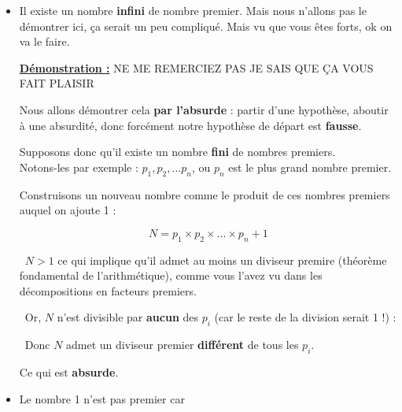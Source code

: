 \documentclass[12pt]{article}
\begin{document}
\begin{itemize}
    \item Il existe un nombre \textbf{infini} de nombre premier.
    Mais nous n'allons pas le démontrer ici, ça serait un peu compliqué. Mais vu que vous êtes forts, ok on va le 
    faire.

    \begin{mdframed}[
        linewidth=1pt,
        roundcorner=5pt,
        linecolor=Plum,
        innertopmargin=10pt,
        innerbottommargin=10pt
    ]
    {\color{Plum}
    \textbf{\underline{Démonstration :}}}
    NE ME REMERCIEZ PAS JE SAIS QUE ÇA VOUS FAIT PLAISIR

    \vspace{5pt}
    Nous allons démontrer cela \textbf{par l'absurde} : partir d'une hypothèse, aboutir à une absurdité, donc forcément 
    notre hypothèse de départ est \textbf{fausse}.

    \vspace{5pt}
    Supposons donc qu'il existe un nombre \textbf{fini} de nombres premiers.
    \\Notons-les par exemple 
    : $p_1, p_2, ... 
    p_n$, ou $p_n$ est le plus grand nombre premier.

    \vspace{5pt}
    Construisons un nouveau nombre comme le produit de ces nombres premiers auquel on ajoute 1 : 

    \vspace{-20pt}
    $$
    N = p_1 \times p_2 \times ... \times p_n + 1
    $$

    \textbullet \ $N > 1$ ce qui implique qu'il admet au moins un diviseur premire (théorème fondamental de 
    l'arithmétique), comme vous l'avez vu dans les décompositions en facteurs premiers.

    \textbullet \ Or, $N$ n'est divisible par \textbf{aucun} des $p_i$ (car le reste de la division serait 1 !) :

    \vspace{0.5cm}
    {\color{black!45}\dotfill}
    
    \vspace{0.5cm}
    {\color{black!45}\dotfill}
    
    \vspace{20pt}

    \textbullet \ Donc $N$ admet un diviseur premier \textbf{différent} de tous les $p_i$.

    \vspace{5pt}
    Ce qui est \textbf{absurde}.
    
    \end{mdframed}

    \vspace{10pt}
    \item Le nombre 1 n'est pas premier car {\color{black!45}\dotfill}
    
\end{itemize}
\end{document}
